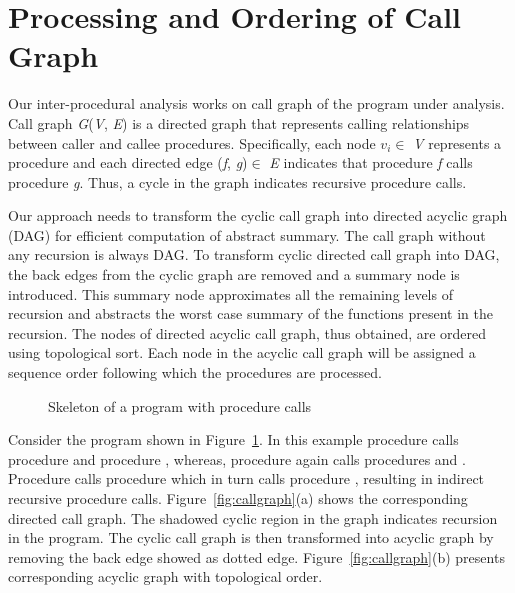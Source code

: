 \section{Processing and Ordering of Call Graph}
\label{sec:callGraph}
Our inter-procedural analysis works on call graph of the 
program under analysis. Call graph \emph{G}(\emph{V}, \emph{E}) 
is a directed graph that represents calling relationships 
between caller and callee procedures. Specifically, each 
node $v_i\in$ \emph{V} represents a procedure and each directed 
edge (\emph{f}, \emph{g})$\in$ \emph{E} indicates that procedure 
\emph{f} calls procedure \emph{g}. Thus, a cycle in the graph indicates 
recursive procedure calls. 

Our approach needs to transform the cyclic call graph into directed 
acyclic graph (DAG) for efficient computation of abstract summary. 
The call graph without any recursion is always DAG. To transform cyclic 
directed call graph into DAG, the back edges 
from the cyclic graph are removed and a summary node is introduced. This 
summary node approximates all the remaining levels of recursion and 
abstracts the worst case summary of the functions present in the recursion. 
The nodes of directed acyclic call graph, thus obtained, are ordered using 
topological sort. Each node in the acyclic call graph will be assigned a sequence 
order following which the procedures are processed. 
\begin{figure}
  \begin{center}
 
  \end{center}
  \caption{\label{fig:codeCallGraph} Skeleton of a program with procedure calls}
\end{figure}
  
\begin{example}{\rm
Consider the program shown in Figure~\ref{fig:codeCallGraph}. In this example 
procedure  calls procedure  and procedure , whereas, 
procedure  again calls procedures  and . Procedure  calls 
procedure  which in turn calls procedure , resulting in 
indirect recursive procedure calls. Figure~\ref{fig:callgraph}(a) shows the corresponding 
directed call graph. The shadowed cyclic region in the graph indicates recursion 
in the program. The cyclic call graph is then 
transformed into acyclic graph by removing the 
back edge showed as dotted edge. Figure~\ref{fig:callgraph}(b) presents 
corresponding acyclic graph 
with topological order. 
}
\hfill\psframebox{}  \end{example}
%
